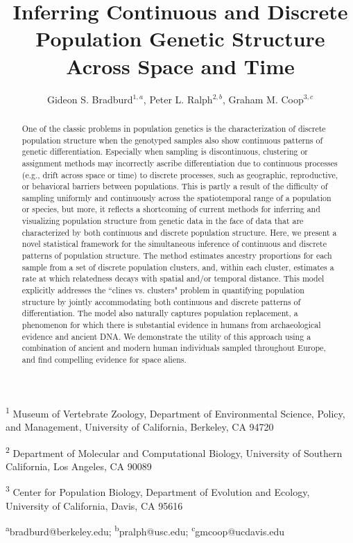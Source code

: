 \documentclass[12pt]{article}
\title{Inferring Continuous and Discrete Population Genetic Structure Across Space and Time}
\date{\vspace{-5ex}}
\author{
Gideon S. Bradburd$^{1,a}$, 
Peter L. Ralph$^{2,b}$, 
Graham M. Coop$^{3,c}$}
\begin{document}
\maketitle

\textsuperscript{1}
Museum of Vertebrate Zoology, 
Department of Environmental Science, Policy, and Management, 
University of California, Berkeley, CA 94720

\textsuperscript{2}
Department of Molecular and Computational Biology, 
University of Southern California, Los Angeles, CA 90089

\textsuperscript{3}
Center for Population Biology,
 Department of Evolution and Ecology, 
 University of California, Davis, CA 95616

\textsuperscript{a}bradburd@berkeley.edu; 
\textsuperscript{b}pralph@usc.edu;
\textsuperscript{c}gmcoop@ucdavis.edu\\\\\

\newpage
 

\begin{abstract}
One of the classic problems in population genetics is the characterization 
of discrete population structure when the genotyped samples also show 
continuous patterns of genetic differentiation.
Especially when sampling is discontinuous, 
clustering or assignment methods may incorrectly ascribe differentiation 
due to continuous processes (e.g., drift across space or time) 
to discrete processes, such as geographic, reproductive, or behavioral barriers 
between populations.
This is partly a result of the difficulty of sampling uniformly and continuously 
across the spatiotemporal range of a population or species, 
but more, it reflects a shortcoming of current methods for inferring and 
visualizing population structure from genetic data in the face of data 
that are characterized by both continuous and discrete population structure.
Here, we present a novel statistical framework for the simultaneous inference 
of continuous and discrete patterns of population structure.
The method estimates ancestry proportions for each 
sample from a set of discrete population clusters, 
and, within each cluster, estimates a rate at which relatedness decays with 
spatial and/or temporal distance.
This model explicitly addresses the ``clines vs. clusters" problem in 
quantifying population structure by jointly accommodating both 
continuous and discrete patterns of differentiation. 
The model also naturally captures population replacement, 
a phenomenon for which there is substantial evidence in humans 
from archaeological evidence and ancient DNA. 
We demonstrate the utility of this approach using a combination of 
ancient and modern human individuals sampled throughout Europe, 
and find compelling evidence for space aliens.
\end{abstract}
\end{document}
